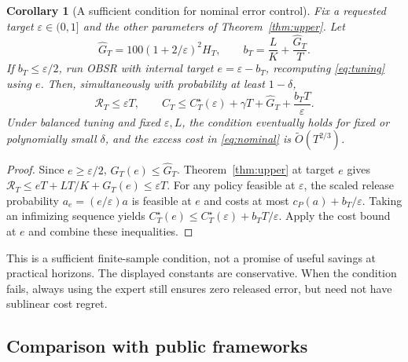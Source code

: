 \documentclass[11pt]{article}
\newtheorem{corollary}[theorem]{Corollary}
\theoremstyle{remark}
\newcommand{\calR}{\mathcal R}
\newcommand{\eps}{\varepsilon}
\begin{document}
\begin{corollary}[A sufficient condition for nominal error control]
\label{cor:tightening}
Fix a requested target $\eps\in(0,1]$ and the other parameters of
Theorem~\ref{thm:upper}. Let
\begin{equation}
 \widehat G_T=100(1+2/\eps)^2H_T,\qquad
 b_T=\frac{L}{K}+\frac{\widehat G_T}{T}.
 \label{eq:tightening}
\end{equation}
If $b_T\le\eps/2$, run OBSR with internal target $e=\eps-b_T$,
recomputing \eqref{eq:tuning} using $e$. Then, simultaneously with
probability at least $1-\delta$,
\begin{equation}
 \calR_T\le\eps T,\qquad
 C_T\le C_T^\star(\eps)+\gamma T+\widehat G_T+\frac{b_TT}{\eps}.
 \label{eq:nominal}
\end{equation}
Under balanced tuning and fixed $\eps,L$, the condition eventually
holds for fixed or polynomially small $\delta$, and the excess cost
in \eqref{eq:nominal} is $\widetilde O(T^{2/3})$.
\end{corollary}
\begin{proof}
Since $e\ge\eps/2$, $G_T(e)\le\widehat G_T$. Theorem~\ref{thm:upper}
at target $e$ gives $\calR_T\le eT+LT/K+G_T(e)\le\eps T$.
For any policy feasible at $\eps$, the scaled release probability
$a_e=(e/\eps)a$ is feasible at $e$ and costs at most
$c_P(a)+b_T/\eps$. Taking an infimizing sequence yields
$C_T^\star(e)\le C_T^\star(\eps)+b_TT/\eps$.
Apply the cost bound at $e$ and combine these inequalities.
\end{proof}
This is a sufficient finite-sample condition, not a promise of useful
savings at practical horizons. The displayed constants are conservative.
When the condition fails, always using the expert still ensures zero
released error, but need not have sublinear cost regret.

\subsection{Comparison with public frameworks}
\label{sec:comparison}
\end{document}
